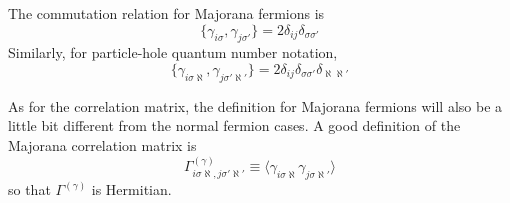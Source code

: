 \documentclass[12font]{article}
\theoremstyle{definition}
\numberwithin{equation}{section}
\newcommand{\anglelr}[1]{\langle #1 \rangle}
\newcommand{\llrg}[1]{\{  #1  \}}
\begin{document}
The commutation relation for Majorana fermions is
\[
\llrg{\gamma_{i\sigma},\gamma_{j\sigma'}} = 2\delta_{ij}\delta_{\sigma\sigma'}
\]
Similarly, for particle-hole quantum number notation,
\begin{equation}\label{comm-maj-def.e}
\llrg{\gamma_{i\sigma\aleph},\gamma_{j\sigma'\aleph'}} = 2\delta_{ij}\delta_{\sigma\sigma'}\delta_{\aleph\aleph'}
\end{equation}

As for the correlation matrix, the definition for Majorana fermions will also be a little bit different from the normal fermion cases. A good definition of the Majorana correlation matrix is
\begin{equation}\label{corr-majorana-def.e}
  \Gamma^{(\gamma)}_{i\sigma\aleph,j\sigma'\aleph'} \equiv \anglelr{\gamma_{i\sigma\aleph}\gamma_{j\sigma\aleph'}}
\end{equation}
so that $\Gamma^{(\gamma)}$ is Hermitian.
\end{document}
